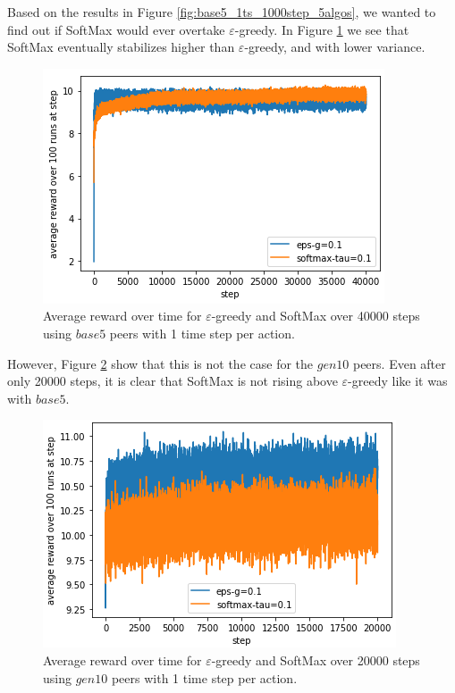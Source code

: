 \documentclass{article}
\begin{document}

Based on the results in Figure \ref{fig:base5_1ts_1000step_5algos}, we wanted to find out if SoftMax would ever overtake $\varepsilon$-greedy. In 
Figure \ref{fig:base5_1ts_40000step_eps_sm} we see that SoftMax eventually stabilizes higher than $\varepsilon$-greedy, and with lower variance.
\begin{figure}[h]
    \centering
    \includegraphics[width=1\linewidth]{figs/base5_1ts_40000step_eps-g_softmax.png}
    \caption{Average reward over time for $\varepsilon$-greedy and SoftMax over 40000 steps using $base5$ peers with 1 time step per action.}
    \label{fig:base5_1ts_40000step_eps_sm}
\end{figure}
However, Figure \ref{fig:gen10_1ts_20000step_eps_sm} show that this is not the case for the $gen10$ peers. Even after only 20000 steps, it is clear that SoftMax 
is not rising above $\varepsilon$-greedy like it was with $base5$. 
\begin{figure}[h]
    \centering
    \includegraphics[width=1\linewidth]{figs/gen10_1ts_20000step_eps-g_softmax.png}
    \caption{Average reward over time for $\varepsilon$-greedy and SoftMax over 20000 steps using $gen10$ peers with 1 time step per action.}
    \label{fig:gen10_1ts_20000step_eps_sm}
\end{figure}
\end{document}
